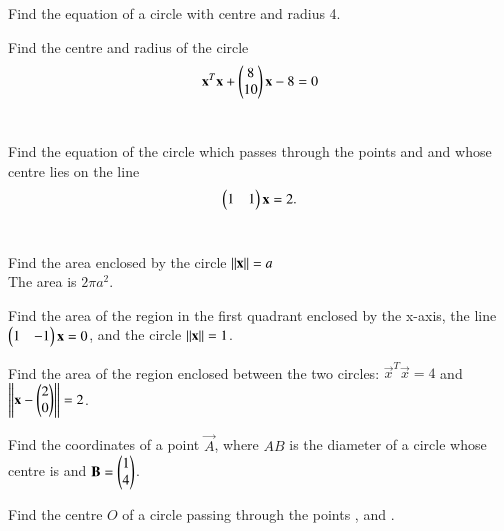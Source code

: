 \item Find the equation of a circle with centre  and radius 4.
\\
\solution 


\item Find the centre and radius of the circle
\begin{align}
\mathbf{x}^T\mathbf{x}+\begin{pmatrix}8\\10\end{pmatrix}\mathbf{x} -8= 0
\end{align}
%
\\
\solution 

\item Find the equation of the circle which passes through the points  and  and whose centre lies on the line 
\begin{align}
\label{eq:4.1.3_line}
\begin{pmatrix}1 & 1\end{pmatrix} \mathbf{x} = 2.
\end{align}
\\
\solution 

\item Find the area enclosed by the circle $\left\lVert\mathbf{x}\right\rVert = a$
%
\\
\solution The area is $2\pi a^2$.
%
\item Find the area of the region in the first quadrant enclosed by the x-axis, the line $\begin{pmatrix}1 & -1\end{pmatrix}\mathbf{x} = 0$, and the circle $\left\lVert\mathbf{x}\right\rVert = 1$.
%
\\
\solution 

%
\item Find the area of the region enclosed between the two circles: $\vec{x}^T\vec{x} = 4$ and $\left\lVert\mathbf{x}-\begin{pmatrix}2\\0\end{pmatrix}\right\rVert = 2$.
%
\item Find the coordinates of a point $\vec{A}$, where $AB$ is the diameter of a circle whose centre is  and $\mathbf{B} = \begin{pmatrix}1\\4\end{pmatrix}$.
\\
\solution 

\item Find the centre $O$ of a circle passing through the points ,  and  .
